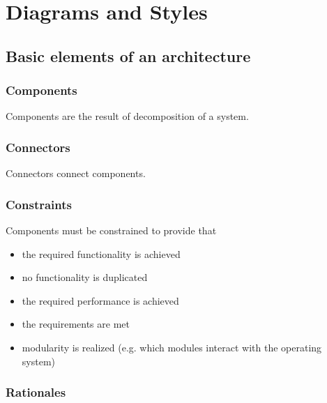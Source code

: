 \chapter{Diagrams and Styles}
	\section{Basic elements of an architecture}
		\subsection{Components}
			Components are the result of decomposition of a system.
			
		\subsection{Connectors}
			Connectors connect components.
		
		\subsection{Constraints}
			Components must be constrained to provide that
			\begin{itemize}
				\item the required functionality is achieved
				\item no functionality is duplicated
				\item the required performance is achieved
				\item the requirements are met
				\item modularity is realized (e.g. which modules interact with
				the operating system)
			\end{itemize}
		
		\subsection{Rationales}
			